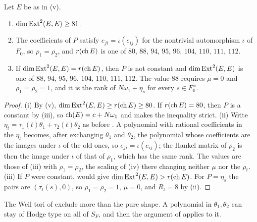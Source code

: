 \begin{corollary}
\label{cor:quarticleast}
Let $E$ be as in \textup{(v)}.
\begin{enumerate}[label=\textup{(\roman*)},leftmargin=2.6em,itemsep=2pt]
\item $\dim\operatorname{Ext}^{2}(E,E)\ge81$.
\item The coefficients of $P$ satisfy $e_{ji}=\iota(e_{ij})$ for the
  nontrivial automorphism $\iota$ of $F_{0}$, so $\rho_{1}=\rho_{2}$, and
  $r(\operatorname{ch} E)$ is one of $80$, $88$, $94$, $95$, $96$, $104$, $110$, $111$,
  $112$.
\item If $\dim\operatorname{Ext}^{2}(E,E)=r(\operatorname{ch} E)$, then $P$ is not constant and
  $\dim\operatorname{Ext}^{2}(E,E)$ is one of $88$, $94$, $95$, $96$, $104$, $110$, $111$,
  $112$. The value $88$ requires $\mu=0$ and $\rho_{1}=\rho_{2}=1$, and it is
  the rank of $N\omega_{1}+\eta_{s}$ for every $s\in F_{0}^{\times}$.
\end{enumerate}
\end{corollary}

\begin{proof}
(i) By (v), $\dim\operatorname{Ext}^{2}(E,E)\ge r(\operatorname{ch} E)\ge80$. If
$r(\operatorname{ch} E)=80$, then $P$ is a constant by (iii), so
$\operatorname{ch}(E)=c+N\omega_{1}$ and  makes the inequality
strict. (ii) Write $\eta_{t}=\tau_{1}(t)\theta_{1}+\tau_{2}(t)\theta_{2}$
as before . A polynomial with rational coefficients in the
$\eta_{t}$ becomes, after exchanging $\theta_{1}$ and $\theta_{2}$, the
polynomial whose coefficients are the images under $\iota$ of the old ones,
so $e_{ji}=\iota(e_{ij})$; the Hankel matrix of $\rho_{2}$ is then the image
under $\iota$ of that of $\rho_{1}$, which has the same rank. The values are
those of (iii) with $\rho_{1}=\rho_{2}$, the scaling
of (iv) there changing neither $\mu$ nor the $\rho_{t}$. (iii) If $P$ were
constant,  would give $\dim\operatorname{Ext}^{2}(E,E)>r(\operatorname{ch} E)$.
For $P=\eta_{s}$ the pairs are $(\tau_{t}(s),0)$, so $\rho_{1}=\rho_{2}=1$,
$\mu=0$, and $R_{t}=8$ by (ii).
\end{proof}

The Weil tori of  exclude more than the pure shape.
A polynomial in $\theta_{1},\theta_{2}$ can stay of Hodge type on all of
$S_{F}$, and then the argument of  applies to it.

